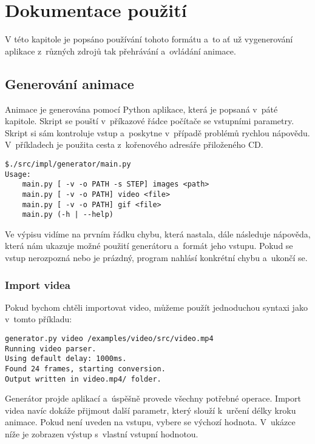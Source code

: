 
\chapter{Dokumentace použití}
\label{chapter:documentation}

V této kapitole je popsáno používání tohoto formátu a~to ať už vygenerování aplikace z~různých zdrojů tak přehrávání a~ovládání animace. 

\section{Generování animace}

Animace je generována pomocí Python aplikace, která je popsaná v~páté kapitole. Skript se pouští v~příkazové řádce počítače se vstupními parametry. Skript si sám kontroluje vstup a~poskytne v~případě problémů rychlou nápovědu. V~příkladech je použita cesta z~kořenového adresáře přiloženého CD. 

\begin{lstlisting}
$./src/impl/generator/main.py
Usage:
    main.py [ -v -o PATH -s STEP] images <path>
    main.py [ -v -o PATH] video <file>
    main.py [ -v -o PATH] gif <file>
    main.py (-h | --help)
\end{lstlisting}


Ve výpisu vidíme na prvním řádku chybu, která nastala, dále následuje nápověda, která nám ukazuje možné použití generátoru a~formát jeho vstupu. Pokud se vstup nerozpozná nebo je prázdný, program nahlásí konkrétní chybu a~ukončí se.


\subsection{Import videa}

Pokud bychom chtěli importovat video, můžeme použít jednoduchou syntaxi jako v~tomto příkladu: 


\begin{lstlisting}
generator.py video /examples/video/src/video.mp4
Running video parser.
Using default delay: 1000ms.
Found 24 frames, starting conversion.
Output written in video.mp4/ folder. 
\end{lstlisting}

Generátor projde aplikací a~úspěšně provede všechny potřebné operace. Import videa navíc dokáže přijmout další parametr, který slouží k~určení délky kroku animace. Pokud není uveden na vstupu, vybere se výchozí hodnota. V~ukázce níže je zobrazen výstup s~vlastní vstupní hodnotou.

